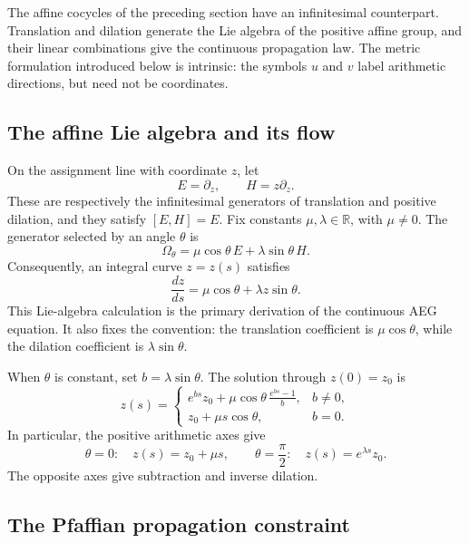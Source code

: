 The affine cocycles of the preceding section have an infinitesimal counterpart.
Translation and dilation generate the Lie algebra of the positive affine group, and
their linear combinations give the continuous propagation law.  The metric
formulation introduced below is intrinsic: the symbols \(u\) and \(v\) label
arithmetic directions, but need not be coordinates.

\subsection{The affine Lie algebra and its flow}

On the assignment line with coordinate \(z\), let
\[
 E=\partial_z,
 \qquad
 H=z\partial_z .
\]
These are respectively the infinitesimal generators of translation and positive
dilation, and they satisfy \([E,H]=E\).  Fix constants
\(\mu,\lambda\in\mathbb R\), with \(\mu\ne0\).  The generator selected by an angle
\(\theta\) is
\begin{equation}\label{eq:angular-affine-generator}
 \Omega_\theta
 =\mu\cos\theta\,E+\lambda\sin\theta\,H .
\end{equation}
Consequently, an integral curve \(z=z(s)\) satisfies
\begin{equation}\label{eq:continuous-affine-flow}
 \frac{dz}{ds}
 =\mu\cos\theta+\lambda z\sin\theta .
\end{equation}
This Lie-algebra calculation is the primary derivation of the continuous AEG
equation.  It also fixes the convention: the translation coefficient is
\(\mu\cos\theta\), while the dilation coefficient is
\(\lambda\sin\theta\).

When \(\theta\) is constant, set \(b=\lambda\sin\theta\).  The solution through
\(z(0)=z_0\) is
\begin{equation}\label{eq:directional-affine-solution}
 z(s)=
 \begin{cases}
  e^{bs}z_0+\displaystyle\mu\cos\theta\,\frac{e^{bs}-1}{b},
     & b\ne0,\\[7pt]
  z_0+\mu s\cos\theta, & b=0.
 \end{cases}
\end{equation}
In particular, the positive arithmetic axes give
\[
 \theta=0:\quad z(s)=z_0+\mu s,
 \qquad
 \theta=\frac{\pi}{2}:\quad z(s)=e^{\lambda s}z_0.
\]
The opposite axes give subtraction and inverse dilation.

\subsection{The Pfaffian propagation constraint}


